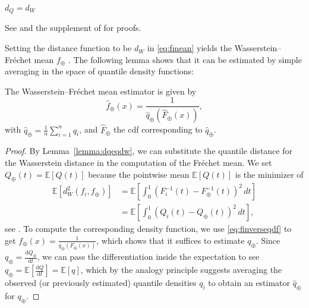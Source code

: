 \begin{lemma}
    \label{lemma:dqeqdw}
    $d_Q = d_W$
\end{lemma}
See \textcite{PetersenLiuDivani2021} and the supplement of \textcite{PetersenMüller2016}
for proofs.

Setting the distance function to be $d_W$ in \eqref{eq:fmean} yields the
Wasserstein--Fréchet mean $f_\oplus$ \parencite[cf.][]{PetersenLiuDivani2021}. The
following lemma shows that it can be estimated by simple averaging in the space of
quantile density functions:
\begin{lemma}
    \label{lemma:wf_mean_estimator}
    The Wasserstein--Fréchet mean estimator is given by
    \begin{equation}
        \hat{f}_\oplus(x) = \frac{1}{\hat{q}_\oplus(\hat{F}_\oplus(x))},
    \end{equation}
    with $\hat{q}_\oplus = \frac{1}{n} \sum_{i=1}^{n} q_i$, and $\hat{F}_\oplus$ the cdf
    corresponding to $\hat{q}_\oplus$.
\end{lemma}
\begin{proof}
    By Lemma~\ref{lemma:dqeqdw}, we can substitute the quantile distance for the
    Wasserstein distance in the computation of the Fréchet mean. We set
    $Q_\oplus(t) = \mathbb{E}[Q(t)]$ because the pointwise mean $\mathbb{E}[Q(t)]$ is
    the minimizer of
    \begin{equation}
    \label{eq:wf_mean}
        \begin{aligned}
            \mathbb{E}[d_W^2(f_i, f_\oplus)]	& =
            \mathbb{E}\left[\int_{0}^{1}(F_i^{-1}(t) - F_\oplus^{-1}(t))^2 \,dt\right] \\
                                    & =
            \mathbb{E}\left[\int_{0}^{1}(Q_i(t) - Q_\oplus(t))^2 \,dt\right],
        \end{aligned}
    \end{equation}
    see \citet[Chapter~3.1.4]{PanaretosZemel2020}. To compute the corresponding density
    function, we use \eqref{eq:finverseqdf} to get
    $f_\oplus(x) = \frac{1}{q_\oplus(F_\oplus(x))}$, which shows that it suffices to
    estimate $q_\oplus$. Since
    $q_\oplus = \frac{\mathrm{d}Q_\oplus}{\mathrm{d}t}$, we can pass the differentiation
    inside the expectation to see
    $q_\oplus = \mathbb{E}\left[\frac{\mathrm{d}Q}{\mathrm{d}t}\right] = \mathbb{E}[q]$,
    which by the analogy principle suggests averaging the observed (or previously
    estimated) quantile densities $q_i$ to obtain an estimator $\hat{q}_\oplus$ for
    $q_\oplus$.
\end{proof}
